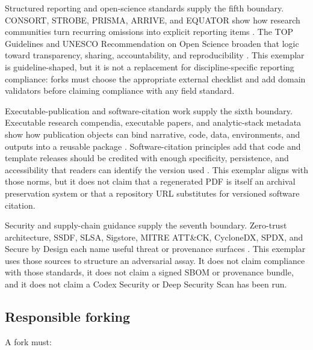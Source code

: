 \documentclass[
]{article}
\begin{document}
Structured reporting and open-science standards supply the fifth
boundary. CONSORT, STROBE, PRISMA, ARRIVE, and EQUATOR show how research
communities turn recurring omissions into explicit reporting items
\citep{schulz2010consort, vonelm2007strobe, page2021prisma, percie_du_sert2020arrive, equator_network_reporting_guidelines}.
The TOP Guidelines and UNESCO Recommendation on Open Science broaden
that logic toward transparency, sharing, accountability, and
reproducibility \citep{nosek2015top, unesco2021_open_science}. This
exemplar is guideline-shaped, but it is not a replacement for
discipline-specific reporting compliance: forks must choose the
appropriate external checklist and add domain validators before claiming
compliance with any field standard.

Executable-publication and software-citation work supply the sixth
boundary. Executable research compendia, executable papers, and
analytic-stack metadata show how publication objects can bind narrative,
code, data, environments, and outputs into a reusable package
\citep{nuest2017erc, lasser2020executable, chen2021metadata}.
Software-citation principles add that code and template releases should
be credited with enough specificity, persistence, and accessibility that
readers can identify the version used \citep{smith2016softwarecitation}.
This exemplar aligns with those norms, but it does not claim that a
regenerated PDF is itself an archival preservation system or that a
repository URL substitutes for versioned software citation.

Security and supply-chain guidance supply the seventh boundary.
Zero-trust architecture, SSDF, SLSA, Sigstore, MITRE ATT\&CK, CycloneDX,
SPDX, and Secure by Design each name useful threat or provenance
surfaces
\citep{nist_sp800_207_zero_trust, nist_sp800_218_ssdf, slsa_v1_2, sigstore_docs, mitre_attack, cyclonedx_spec, spdx_spec, cisa_secure_by_design}.
This exemplar uses those sources to structure an adversarial assay. It
does not claim compliance with those standards, it does not claim a
signed SBOM or provenance bundle, and it does not claim a Codex Security
or Deep Security Scan has been run.

\subsection{Responsible forking}\label{responsible-forking}

A fork must:
\end{document}
